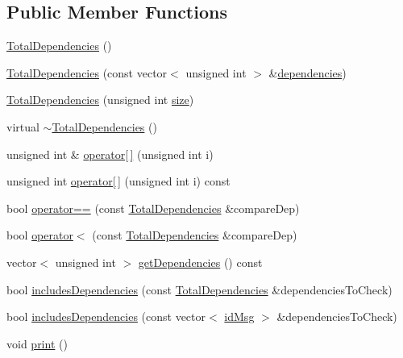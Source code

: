 \subsection*{Public Member Functions}
\begin{DoxyCompactItemize}
\item 
\hyperlink{class_total_dependencies_ae066781ee6df2248ee0091a094c1fc1b}{Total\+Dependencies} ()
\item 
\hyperlink{class_total_dependencies_a8bed75c4fa1477c1a5ca07df4c5191cd}{Total\+Dependencies} (const vector$<$ unsigned int $>$ \&\hyperlink{class_total_dependencies_a94825b4f782c30dfebf69dd2eba0bb1f}{dependencies})
\item 
\hyperlink{class_total_dependencies_a8623366d95adc8d1b4da4dee028acbd4}{Total\+Dependencies} (unsigned int \hyperlink{class_total_dependencies_a00ea27540cc51d5770d6013a21a41de2}{size})
\item 
virtual \hyperlink{class_total_dependencies_a960e7c1a6ca7a552cc36fb0bd1244d23}{$\sim$\+Total\+Dependencies} ()
\item 
unsigned int \& \hyperlink{class_total_dependencies_a3ec4e57f16606c11d6bd9de29a93c045}{operator\mbox{[}$\,$\mbox{]}} (unsigned int i)
\item 
unsigned int \hyperlink{class_total_dependencies_ad684b13fac0f7474fa68880ef9f5a30a}{operator\mbox{[}$\,$\mbox{]}} (unsigned int i) const
\item 
bool \hyperlink{class_total_dependencies_a8e3f326e355d9bb0364f160dcf0a4126}{operator==} (const \hyperlink{class_total_dependencies}{Total\+Dependencies} \&compare\+Dep)
\item 
bool \hyperlink{class_total_dependencies_ae5899d93bd269484c5ed6b5809d8d500}{operator$<$} (const \hyperlink{class_total_dependencies}{Total\+Dependencies} \&compare\+Dep)
\item 
vector$<$ unsigned int $>$ \hyperlink{class_total_dependencies_a43a89fb00be27b354a4df86f6c3c8b6e}{get\+Dependencies} () const
\item 
bool \hyperlink{class_total_dependencies_a66aebb100cbce0faf5551fd74b0de0d8}{includes\+Dependencies} (const \hyperlink{class_total_dependencies}{Total\+Dependencies} \&dependencies\+To\+Check)
\item 
bool \hyperlink{class_total_dependencies_aed1c3ce4bee031ca9341d8ce4a179ef0}{includes\+Dependencies} (const vector$<$ \hyperlink{structures_8h_a83a1d9a070efa5341da84cfd8e28d3e5}{id\+Msg} $>$ \&dependencies\+To\+Check)
\item 
void \hyperlink{class_total_dependencies_abd5c49f26000acb2c45d8b967922c7e7}{print} ()

\end{DoxyCompactItemize}
